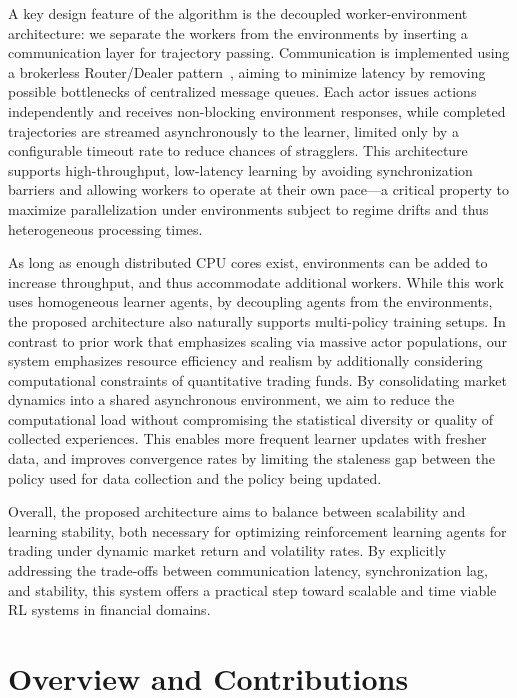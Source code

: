 A key design feature of the algorithm is the decoupled worker-environment architecture:
we separate the workers from the environments by inserting a communication layer for trajectory passing.
Communication is implemented using a brokerless Router/Dealer pattern~\citep{Hintjens2013}, aiming to minimize latency by
removing possible bottlenecks of centralized message queues.
Each actor issues actions independently and receives non-blocking environment responses,
while completed trajectories are streamed asynchronously to the learner,
limited only by a configurable timeout rate to reduce chances of stragglers.
This architecture supports high-throughput, low-latency learning by avoiding synchronization barriers and
allowing workers to operate at their own pace---a critical property to maximize parallelization under 
environments subject to regime drifts and thus heterogeneous processing times.

As long as enough distributed CPU cores exist, environments can be added to increase throughput, and thus accommodate additional workers.
While this work uses homogeneous learner agents, by decoupling agents from the environments, 
the proposed architecture also naturally supports multi-policy training setups.
In contrast to prior work that emphasizes scaling via massive actor populations,
our system emphasizes resource efficiency and realism by additionally considering computational constraints of quantitative trading funds.
By consolidating market dynamics into a shared asynchronous environment,
we aim to reduce the computational load without compromising the statistical diversity or quality of collected experiences.
This enables more frequent learner updates with fresher data, and improves convergence rates by limiting the staleness gap
between the policy used for data collection and the policy being updated.

Overall, the proposed architecture aims to balance between scalability and learning stability,
both necessary for optimizing reinforcement learning agents for trading under dynamic market return and volatility rates.
By explicitly addressing the trade-offs between communication latency, synchronization lag, and stability,
this system offers a practical step toward scalable and time viable RL systems in financial domains.

\section{Overview and Contributions}
\label{sec:overview}

